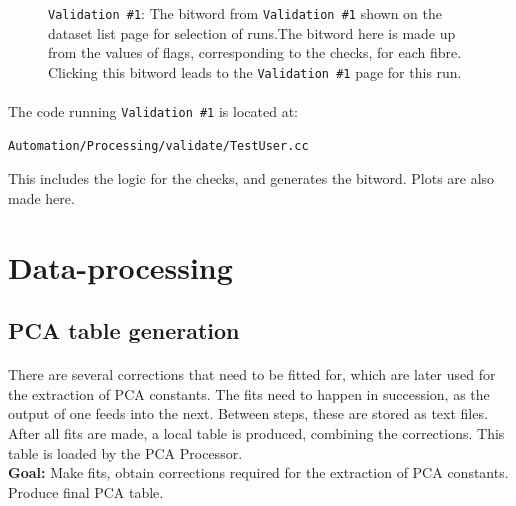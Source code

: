 \documentclass[12pt]{article}
\begin{document}
\begin{figure}
\centering
\noindent{}
  \caption{\centering \texttt{Validation \#1}: The bitword from \texttt{Validation \#1} shown on the dataset list page for selection of runs.\hspace{\textwidth}The bitword here is made up from the values of flags, corresponding to the checks, for each fibre. Clicking this bitword leads to the \texttt{Validation \#1} page for this run.}
  \label{fig:val15}
\end{figure}

\paragraph{}
The code running \texttt{Validation \#1} is located at:
\begin{lstlisting}
Automation/Processing/validate/TestUser.cc
\end{lstlisting}
This includes the logic for the checks, and generates the bitword. Plots are also made here.

\clearpage

\section{Data-processing}
\subsection{PCA table generation}\label{sec:fits}
\paragraph{}
There are several corrections that need to be fitted for, which are later used for the extraction of PCA constants. The fits need to happen in succession, as the output of one feeds into the next. Between steps, these are stored as text files. After all fits are made, a local table is produced, combining the corrections. This table is loaded by the PCA Processor.\\
\textbf{Goal:} Make fits, obtain corrections required for the extraction of PCA constants. Produce final PCA table.
\end{document}
